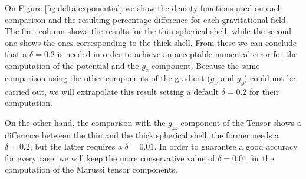 \documentclass[extra]{gji}
\begin{document}
On Figure \ref{fig:delta-exponential} we show the density functions 
used on each comparison and the resulting percentage difference for each 
gravitational field.
The first column shows the results for the thin spherical shell, while the 
second one shows the ones corresponding to the thick shell.
From these we can conclude that a $\delta = 0.2$ is needed in order to 
achieve an acceptable numerical error for the computation of the 
potential and the $g_z$ component.
Because the same comparison using the other components of the gradient ($g_x$ 
and $g_y$) could not be carried out, we will extrapolate this result 
setting a default $\delta = 0.2$ for their computation.

On the other hand, the comparison with the $g_{zz}$ component of the 
Tensor shows a difference between the thin and the thick spherical 
shell: the former needs a $\delta = 0.2$, but the latter requires a 
$\delta = 0.01$.
In order to guarantee a good accuracy for every case, we will keep the 
more conservative value of $\delta = 0.01$ for the computation of the 
Marussi tensor components.
\end{document}
